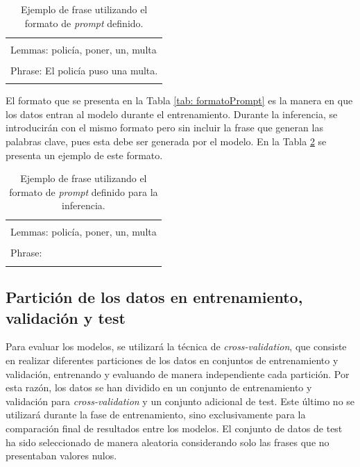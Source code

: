 \documentclass[11pt,spanish,listoffigures,listoftables]{tfgetsinf}
\begin{document}
\begin{table}[!h]
\caption{Ejemplo de frase utilizando el formato de \textit{prompt} definido.}
\begin{center}
\begin{tabular}{ | l | }
\hline
	\\
	Lemmas: policía, poner, un, multa \\
	\\
	Phrase: El policía puso una multa. \\
	\\
\hline
\end{tabular}
\end{center}
\label{tab: ejemploPrompt}
\end{table}


El formato que se presenta en la Tabla \ref{tab: formatoPrompt} es la manera en que los datos entran al modelo durante el entrenamiento. Durante la inferencia, se introducirán con el mismo formato pero sin incluir la frase que generan las palabras clave, pues esta debe ser generada por el modelo. En la Tabla \ref{tab: formatoInferencia} se presenta un ejemplo de este formato.

\begin{table}[!h]
\caption{Ejemplo de frase utilizando el formato de \textit{prompt} definido para la inferencia.}
\begin{center}
\begin{tabular}{ | l | }
\hline
	\\
	Lemmas: policía, poner, un, multa \\
	\\
	Phrase: \\
	\\
\hline
\end{tabular}
\end{center}
\label{tab: formatoInferencia}
\end{table}

\subsection{Partición de los datos en entrenamiento, validación y test}

Para evaluar los modelos, se utilizará la técnica de \textit{cross-validation}, que consiste en realizar diferentes particiones de los datos en conjuntos de entrenamiento y validación, entrenando y evaluando de manera independiente cada partición. Por esta razón, los datos se han dividido en un conjunto de entrenamiento y validación para \textit{cross-validation} y un conjunto adicional de test. Este último no se utilizará durante la fase de entrenamiento, sino exclusivamente para la comparación final de resultados entre los modelos. El conjunto de datos de test ha sido seleccionado de manera aleatoria considerando solo las frases que no presentaban valores nulos.
\end{document}
